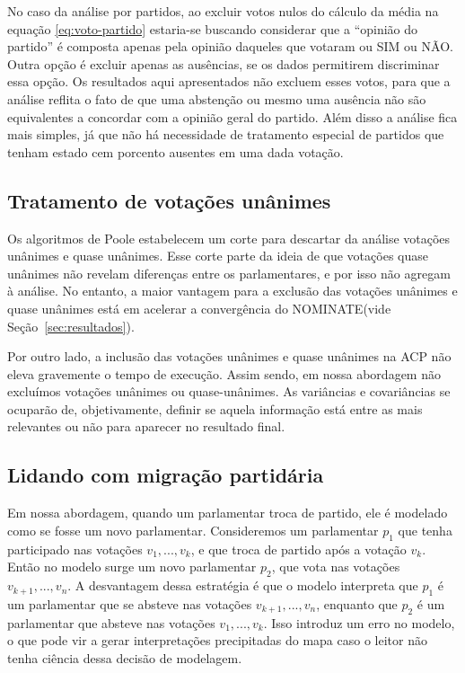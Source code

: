 \documentclass[
	article,			%
	12pt,				%
	oneside,			%
	a4paper,			%
	english,			%
	brazil,				%
	sumario=tradicional,
	oldfontcommands %
	]{abntex2}
\newcommand\nay{NÃO\xspace}
\newcommand\yea{SIM\xspace}
\newcommand\nominate{NOMINATE\xspace}
\begin{document}

No caso da análise por partidos, ao excluir votos nulos do cálculo da média na equação \ref{eq:voto-partido} estaria-se buscando considerar que a ``opinião do partido'' é composta apenas pela opinião daqueles que votaram ou \yea ou \nay. Outra opção é excluir apenas as ausências, se os dados permitirem discriminar essa opção. Os resultados aqui apresentados não excluem esses votos, para que a análise reflita o fato de que uma abstenção ou mesmo uma ausência não são equivalentes a concordar com a opinião geral do partido. Além disso a análise fica mais simples, já que não há necessidade de tratamento especial de partidos que tenham estado cem porcento ausentes em uma dada votação.

\subsection{Tratamento de votações unânimes}

Os algoritmos de Poole estabelecem um corte para descartar da análise votações unânimes e quase unânimes. Esse corte parte da ideia de que votações quase unânimes não revelam diferenças entre os parlamentares, e por isso não agregam à análise. No entanto, a maior vantagem para a exclusão das votações unânimes e quase unânimes está em acelerar a convergência do \nominate (vide Seção~\ref{sec:resultados}).

Por outro lado, a inclusão das votações unânimes e quase unânimes na ACP não eleva gravemente o tempo de execução. Assim sendo, em nossa abordagem não excluímos votações unânimes ou quase-unânimes. As variâncias e covariâncias se ocuparão de, objetivamente, definir se aquela informação está entre as mais relevantes ou não para aparecer no resultado final.

\subsection{Lidando com migração partidária}

Em nossa abordagem, quando um parlamentar troca de partido, ele é modelado como se fosse um novo parlamentar. Consideremos um parlamentar $p_1$ que tenha participado nas votações $v_1, ..., v_k$, e que troca de partido após a votação $v_k$. Então no modelo surge um novo parlamentar $p_2$, que vota nas votações $v_{k+1}, ..., v_n$. A desvantagem dessa estratégia é que o modelo interpreta que $p_1$ é um parlamentar que se absteve nas votações $v_{k+1}, ..., v_n$, enquanto que $p_2$ é um parlamentar que absteve nas votações $v_1, ..., v_k$. Isso introduz um erro no modelo, o que pode vir a gerar interpretações precipitadas do mapa caso o leitor não tenha ciência dessa decisão de modelagem.
\end{document}
